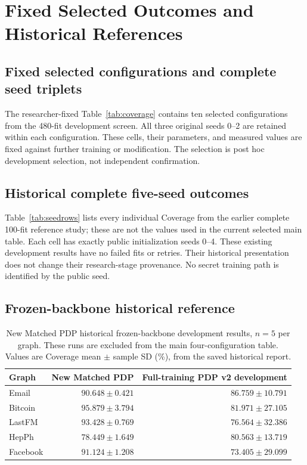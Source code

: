 \chapter{Fixed Selected Outcomes and Historical References}\label{app:development}
\section{Fixed selected configurations and complete seed triplets}
The researcher-fixed Table~\ref{tab:coverage} contains ten selected configurations from the 480-fit development screen. All three original seeds 0--2 are retained within each configuration. These cells, their parameters, and measured values are fixed against further training or modification. The selection is post hoc development selection, not independent confirmation.



\clearpage
\section{Historical complete five-seed outcomes}
Table~\ref{tab:seedrows} lists every individual Coverage from the earlier complete 100-fit reference study; these are not the values used in the current selected main table. Each cell has exactly public initialization seeds 0--4. These existing development results have no failed fits or retries. Their historical presentation does not change their research-stage provenance. No secret training path is identified by the public seed.


\clearpage
\section{Frozen-backbone historical reference}
\begin{table}[htbp]
\centering\small
\caption{New Matched PDP historical frozen-backbone development results, $n=5$ per graph. These runs are excluded from the main four-configuration table. Values are Coverage mean $\pm$ sample SD (\%), from the saved historical report.}\label{tab:newmatched}
\begin{tabular}{lrr}\toprule
Graph & New Matched PDP & Full-training PDP v2 development\\\midrule
Email & $90.648\pm0.421$ & $86.759\pm10.791$\\
Bitcoin & $95.879\pm3.794$ & $81.971\pm27.105$\\
LastFM & $93.428\pm0.769$ & $76.564\pm32.386$\\
HepPh & $78.449\pm1.649$ & $80.563\pm13.719$\\
Facebook & $91.124\pm1.208$ & $73.405\pm29.099$\\\bottomrule
\end{tabular}
\end{table}

